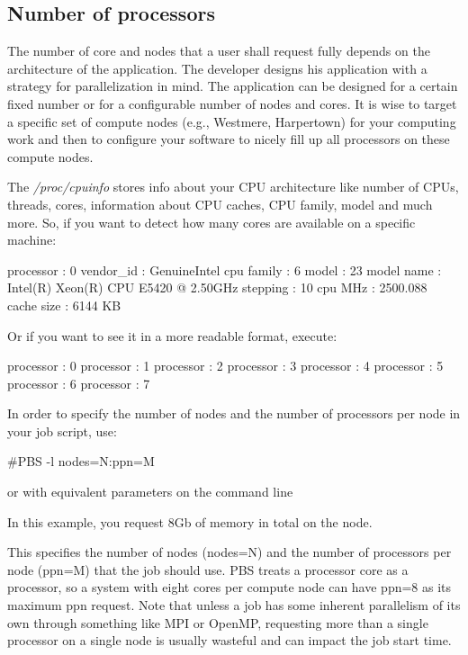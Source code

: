 \subsection{Number of processors}

The number of core and nodes that a user shall request fully depends on the
architecture of the application. The developer designs his application with a
strategy for parallelization in mind. The application can be designed for a
certain fixed number or for a configurable number of nodes and cores. It is
wise to target a specific set of compute nodes (e.g., Westmere, Harpertown) for
your computing work and then to configure your software to nicely fill up all
processors on these compute nodes.

The \emph{/proc/cpuinfo} stores info about your CPU architecture like number of
CPUs, threads, cores, information about CPU caches, CPU family, model and much
more.  So, if you want to detect how many cores are available on a specific
machine:

\begin{prompt}
processor       : 0
vendor_id       : GenuineIntel
cpu family      : 6
model           : 23
model name      : Intel(R) Xeon(R) CPU  E5420  @ 2.50GHz
stepping        : 10
cpu MHz         : 2500.088
cache size      : 6144 KB
\end{prompt}

Or if you want to see it in a more readable format, execute:

\begin{prompt}
processor : 0
processor : 1
processor : 2
processor : 3
processor : 4
processor : 5
processor : 6
processor : 7
\end{prompt}


In order to specify the number of nodes and the number of processors per node in your job script, use:

\begin{prompt}
#PBS -l nodes=N:ppn=M
\end{prompt}

or with equivalent parameters on the command line

\begin{prog}
\end{prog}

In this example, you request 8Gb of memory in total on the node.

This specifies the number of nodes (nodes=N) and the number of processors per
node (ppn=M) that the job should use. PBS treats a processor core as a
processor, so a system with eight cores per compute node can have ppn=8 as its
maximum ppn request. Note that unless a job has some inherent parallelism of
its own through something like MPI or OpenMP, requesting more than a single
processor on a single node is usually wasteful and can impact the job start
time.

